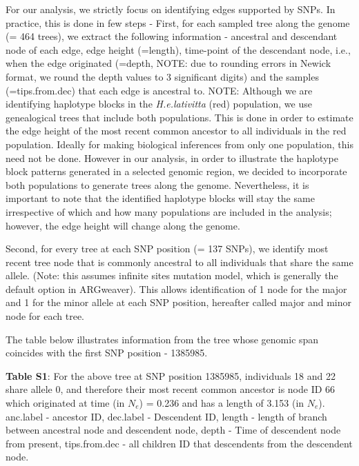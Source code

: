 \documentclass[
]{article}
\begin{document}
For our analysis, we strictly focus on identifying edges supported by
SNPs. In practice, this is done in few steps - First, for each sampled
tree along the genome (= 464 trees), we extract the following
information - ancestral and descendant node of each edge, edge height
(=length), time-point of the descendant node, i.e., when the edge
originated (=depth, NOTE: due to rounding errors in Newick format, we
round the depth values to 3 significant digits) and the samples
(=tips.from.dec) that each edge is ancestral to. NOTE: Although we are
identifying haplotype blocks in the \emph{H.e.lativitta} (red)
population, we use genealogical trees that include both populations.
This is done in order to estimate the edge height of the most recent
common ancestor to all individuals in the red population. Ideally for
making biological inferences from only one population, this need not be
done. However in our analysis, in order to illustrate the haplotype
block patterns generated in a selected genomic region, we decided to
incorporate both populations to generate trees along the genome.
Nevertheless, it is important to note that the identified haplotype
blocks will stay the same irrespective of which and how many populations
are included in the analysis; however, the edge height will change along
the genome.

Second, for every tree at each SNP position (= 137 SNPs), we identify
most recent tree node that is commonly ancestral to all individuals that
share the same allele. (Note: this assumes infinite sites mutation
model, which is generally the default option in ARGweaver). This allows
identification of 1 node for the major and 1 for the minor allele at
each SNP position, hereafter called major and minor node for each tree.

The table below illustrates information from the tree whose genomic span
coincides with the first SNP position - 1385985.

\hfill\break
{\footnotesize \textbf{Table S1}: For the above tree at SNP position 1385985,
individuals 18 and 22 share allele 0, and therefore their most recent
common ancestor is node ID 66 which originated at time (in \(N_e\)) =
0.236 and has a length of 3.153 (in \(N_e\)). anc.label - ancestor ID,
dec.label - Descendent ID, length - length of branch between ancestral
node and descendent node, depth - Time of descendent node from present,
tips.from.dec - all children ID that descendents from the descendent
node.}
\end{document}
